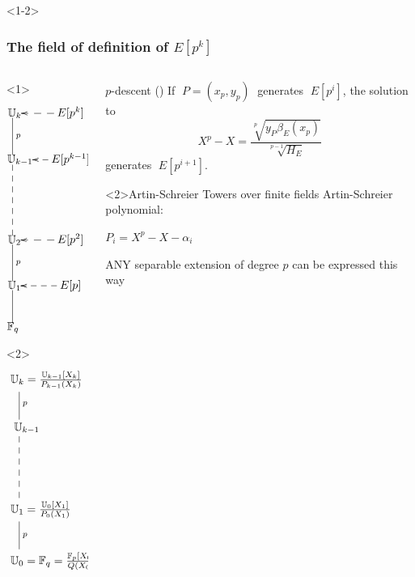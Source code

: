 \documentclass[10pt,usepdftitle=false]{beamer}
\begin{document}
\begin{frame}<1-2>
  \frametitle{The field of definition of $E[p^k]$}
  
  \begin{columns}
    \begin{column}{0.3\textwidth}
      \begin{overlayarea}{\textwidth}{0.9\textheight}
        \begin{onlyenv}<1>
          \large\[\xymatrix@C=20pt{
            *[r]{\U_k} \ar@{-}[d]^p & E[p^k] \ar@{-->}[l]\\
            *[r]{\U_{k-1}} \ar@{--}[dd] & E[p^{k-1}] \ar@{-->}[l]\\
            \\
            *[r]{\U_2} \ar@{-}[d]^p & E[p^2] \ar@{-->}[l]\\
            *[r]{\U_1} \ar@{-}[d] & E[p] \ar@{-->}[l]\\
            *[r]{\F_q}
          }\]
        \end{onlyenv}
        \begin{onlyenv}<2>
          \Large\[\xymatrix{
            *+[r]{\U_k = \frac{\U_{k-1}[X_k]}{P_{k-1}(X_k)}}\ar@{-}[d]^p\\
            *+[r]{\U_{k-1}} \ar@{--}[dd]\\
            \\
            *+[r]{\U_{1} = \frac{\U_0[X_1]}{P_0(X_1)}} \ar@{-}[d]^p\\
            *+[r]{\U_{0} = \F_q = \frac{\F_p[X_0]}{Q(X_0)}}
          }\]
        \end{onlyenv}
      \end{overlayarea}
    \end{column}
    \begin{column}{0.65\textwidth}
      \begin{block}{$p$-descent (\cite{voloch90})}
        If $\;P=(x_p,y_p)\;$ generates $\;E[p^i]$, the solution to
        \[X^p - X = \frac{\sqrt[p]{y_P\beta_E(x_p)}}{\sqrt[p-1]{H_E}}\]
        generates $\;E[p^{i+1}]$.
      \end{block}

      \begin{block}<2>{Artin-Schreier Towers over finite fields}
        Artin-Schreier polynomial:
        
        \begin{center}
          \Large\emph{$P_i = X^p - X - \alpha_i$}
        \end{center}

        \alert{ANY} separable extension of degree $p$ can be expressed
        this way
      \end{block}
    \end{column}
  \end{columns}
\end{frame}
\end{document}
